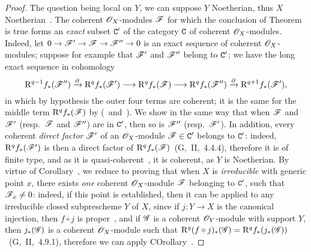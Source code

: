 \begin{proof}
The question being local on $Y$, we can suppose $Y$ Noetherian, thus $X$ Noetherian~.
The coherent $\mathscr{O}_X$-modules $\mathscr{F}$ for which the conclusion of Theorem~ is true forms an \emph{exact} subset $\mathtt{C}'$ of the category $\mathtt{C}$ of coherent $\mathscr{O}_X$-modules.
Indeed, let $0\to\sh{F}'\to\sh{F}\to\sh{F}''\to 0$ is an exact sequence of coherent $\mathscr{O}_X$-modules; suppose for example that $\mathscr{F}'$ and $\mathscr{F}''$ belong to $\mathtt{C}'$; we have the long exact sequence in cohomology
\[
  \RR^{q-1}f_*(\sh{F}'')\xrightarrow{\partial}\RR^q f_*(\sh{F}')\to\RR^q f_*(\sh{F})\to\RR^q f_*(\sh{F}'')\xrightarrow{\partial}\RR^{q+1}f_*(\sh{F}'),
\]
in which by hypothesis the outer four terms are coherent; it is the same for the middle term $\mathrm{R}^q f_*(\mathscr{F})$ by (~and~).
We show in the same way that when $\mathscr{F}$ and $\mathscr{F}'$ (resp.~$\mathscr{F}$ and $\mathscr{F}''$) are in $\mathtt{C}'$, then so is $\mathscr{F}''$ (resp.~$\mathscr{F}'$).
In addition, every coherent \emph{direct factor} $\mathscr{F}'$ of an $\mathscr{O}_X$-module $\mathscr{F}\in\mathtt{C}'$ belongs to $\mathtt{C}'$: indeed, $\mathrm{R}^q f_*(\mathscr{F}')$ is then a direct factor of $\mathrm{R}^q f_*(\mathscr{F})$~(G,~II,~4.4.4), therefore it is of finite type, and as it is quasi-coherent~, it is coherent, as $Y$ is Noetherian.
By virtue of Corollary~, we reduce to proving that when $X$ is \emph{irreducible} with generic point $x$, there exists \emph{one} coherent $\mathscr{O}_X$-module $\mathscr{F}$ belonging to $\mathtt{C}'$, such that $\mathscr{F}_x\neq 0$: indeed, if this point is established, then it can be applied to any irreducible closed subprescheme $Y$ of $X$, since if $j:Y\to X$ is the canonical injection, then $f\circ j$ is proper~, and if $\mathscr{G}$ is a coherent $\mathscr{O}_Y$-module with support $Y$, then $j_*(\mathscr{G})$ is a coherent $\mathscr{O}_X$-module such that $\mathrm{R}^q(f\circ j)_*(\mathscr{G})=\mathrm{R}^q f_*(j_*(\mathscr{G}))$~(G,~II,~4.9.1), therefore we can apply COrollary~.


\end{proof}
